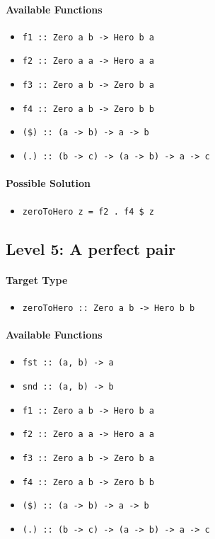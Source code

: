 \documentclass[preprint,12pt]{elsarticle}
\begin{document}
\paragraph{Available Functions} 
\begin{itemize}
    \item \texttt{f1 :: Zero a b -> Hero b a}
    \item \texttt{f2 :: Zero a a -> Hero a a}
    \item \texttt{f3 :: Zero a b -> Zero b a}
    \item \texttt{f4 :: Zero a b -> Zero b b}
    \item \texttt{(\$) :: (a -> b) -> a -> b}
    \item \texttt{(.) :: (b -> c) -> (a -> b) -> a -> c}
\end{itemize}

\paragraph{Possible Solution} 
\begin{itemize}
    \item \texttt{zeroToHero z = f2 . f4 \$ z}
\end{itemize}


\subsection{Level 5: A perfect pair}
\paragraph{Target Type } 
\begin{itemize}
    \item \texttt{zeroToHero :: Zero a b -> Hero b b}
\end{itemize}

\paragraph{Available Functions} 
\begin{itemize}
    \item \texttt{fst :: (a, b) -> a}
    \item \texttt{snd :: (a, b) -> b}
    \item \texttt{f1 :: Zero a b -> Hero b a}
    \item \texttt{f2 :: Zero a a -> Hero a a}
    \item \texttt{f3 :: Zero a b -> Zero b a}
    \item \texttt{f4 :: Zero a b -> Zero b b}
    \item \texttt{(\$) :: (a -> b) -> a -> b}
    \item \texttt{(.) :: (b -> c) -> (a -> b) -> a -> c}
\end{itemize}
\end{document}
